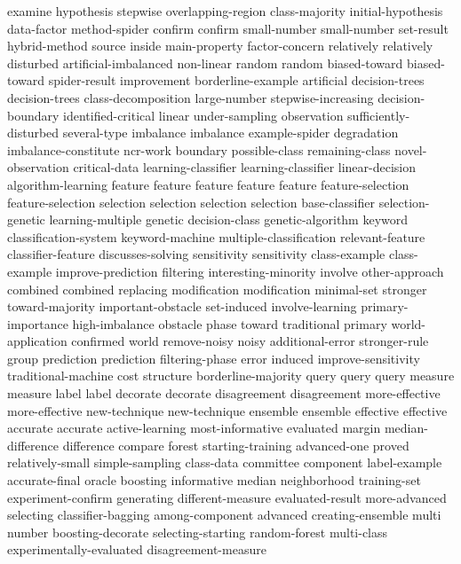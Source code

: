 examine	
hypothesis	
stepwise	
overlapping-region	
class-majority	
initial-hypothesis	
data-factor	
method-spider	
confirm	confirm	
small-number	small-number	
set-result	
hybrid-method	
source	
inside	
main-property	
factor-concern	
relatively	relatively	
disturbed	
artificial-imbalanced	
non-linear	
random	random	
biased-toward	biased-toward	
spider-result	
improvement	
borderline-example	
artificial	
decision-trees	decision-trees	
class-decomposition	
large-number	
stepwise-increasing	
decision-boundary	
identified-critical	
linear	
under-sampling	
observation	
sufficiently-disturbed	
several-type	
imbalance	imbalance	
example-spider	
degradation	
imbalance-constitute	
ncr-work	
boundary	
possible-class	
remaining-class	
novel-observation	
critical-data	
learning-classifier	learning-classifier	
linear-decision	
algorithm-learning	
feature	feature	feature	feature	feature	
feature-selection	feature-selection	
selection	selection	selection	selection	
base-classifier	
selection-genetic	
learning-multiple	
genetic	
decision-class	
genetic-algorithm	
keyword	
classification-system	
keyword-machine	
multiple-classification	
relevant-feature	
classifier-feature	
discusses-solving	
sensitivity	sensitivity	
class-example	class-example	
improve-prediction	
filtering	
interesting-minority	
involve	
other-approach	
combined	combined	
replacing	
modification	modification	
minimal-set	
stronger	
toward-majority	
important-obstacle	
set-induced	
involve-learning	
primary-importance	
high-imbalance	
obstacle	
phase	
toward	
traditional	
primary	
world-application	
confirmed	
world	
remove-noisy	
noisy	
additional-error	
stronger-rule	
group	
prediction	prediction	
filtering-phase	
error	
induced	
improve-sensitivity	
traditional-machine	
cost	
structure	
borderline-majority	
query	query	query	
measure	measure	
label	label	
decorate	decorate	
disagreement	disagreement	
more-effective	more-effective	
new-technique	new-technique	
ensemble	ensemble	
effective	effective	
accurate	accurate	
active-learning	
most-informative	
evaluated	
margin	
median-difference	
difference	
compare	
forest	
starting-training	
advanced-one	
proved	
relatively-small	
simple-sampling	
class-data	
committee	
component	
label-example	
accurate-final	
oracle	
boosting	
informative	
median	
neighborhood	
training-set	
experiment-confirm	
generating	
different-measure	
evaluated-result	
more-advanced	
selecting	
classifier-bagging	
among-component	
advanced	
creating-ensemble	
multi	
number	
boosting-decorate	
selecting-starting	
random-forest	
multi-class	
experimentally-evaluated	
disagreement-measure	
